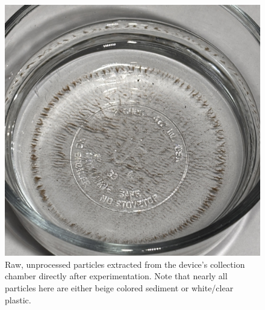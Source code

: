 \documentclass[fleqn,10pt]{SelfArx} %
\begin{document}
	\begin{figure}[h]
		\centering
		\includegraphics[angle=270,width=1\linewidth]{Figures/RawSeparated}
		\caption[Raw Separated Plastics]{Raw, unprocessed particles extracted from the device's collection chamber directly after experimentation. Note that nearly all particles here are either beige colored sediment or white/clear plastic.}
		\label{fig:rawseparated}
	\end{figure}
	
\end{document}
